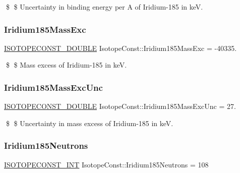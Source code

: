\$ \$ Uncertainty in binding energy per A of Iridium-\/185 in keV. \mbox{\label{group___isotope_const-_iridium-_ir185_ga0054fe86ae10179c774255cd2c073a7a}} 
\subsubsection{\texorpdfstring{Iridium185\+Mass\+Exc}{Iridium185MassExc}}
{\footnotesize\ttfamily \mbox{\hyperlink{group___isotope_const-_macros_ga8f45a7272ce02c0b4c65c44636ed719a}{I\+S\+O\+T\+O\+P\+E\+C\+O\+N\+S\+T\+\_\+\+D\+O\+U\+B\+LE}} Isotope\+Const\+::\+Iridium185\+Mass\+Exc = -\/40335.}

\$ \$ Mass excess of Iridium-\/185 in keV. \mbox{\label{group___isotope_const-_iridium-_ir185_gac4392bc48dfd21f89875eedbfd08d9fa}} 
\subsubsection{\texorpdfstring{Iridium185\+Mass\+Exc\+Unc}{Iridium185MassExcUnc}}
{\footnotesize\ttfamily \mbox{\hyperlink{group___isotope_const-_macros_ga8f45a7272ce02c0b4c65c44636ed719a}{I\+S\+O\+T\+O\+P\+E\+C\+O\+N\+S\+T\+\_\+\+D\+O\+U\+B\+LE}} Isotope\+Const\+::\+Iridium185\+Mass\+Exc\+Unc = 27.}

\$ \$ Uncertainty in mass excess of Iridium-\/185 in keV. \mbox{\label{group___isotope_const-_iridium-_ir185_ga912575bf29e2b8af7a01f084369042ea}} 
\subsubsection{\texorpdfstring{Iridium185\+Neutrons}{Iridium185Neutrons}}
{\footnotesize\ttfamily \mbox{\hyperlink{group___isotope_const-_macros_ga5f18360b3e99483a35c32d789e62621c}{I\+S\+O\+T\+O\+P\+E\+C\+O\+N\+S\+T\+\_\+\+I\+NT}} Isotope\+Const\+::\+Iridium185\+Neutrons = 108}

